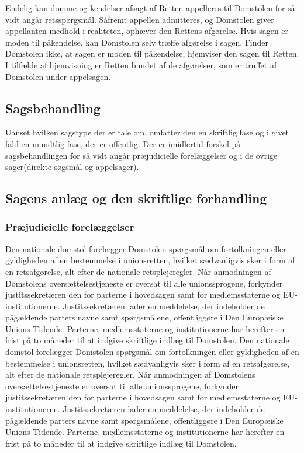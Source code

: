 \documentclass[]{book}
\begin{document}
Endelig kan domme og kendelser afsagt af Retten appelleres til Domstolen for så vidt angår retsspørgsmål. Såfremt appellen admitteres, og Domstolen giver appellanten medhold i realiteten, ophæver den Rettens afgørelse. Hvis sagen er moden til påkendelse, kan Domstolen selv træffe afgørelse i sagen. Finder Domstolen ikke, at sagen er moden til påkendelse, hjemviser den sagen til Retten. I tilfælde af hjemvisning er Retten bundet af de afgørelser, som er truffet af Domstolen under appelsagen.

\hypertarget{sagsbehandling}{%
\subsection{Sagsbehandling}\label{sagsbehandling}}

Uanset hvilken sagstype der er tale om, omfatter den en skriftlig fase og i givet fald en mundtlig fase, der er offentlig. Der er imidlertid forskel på sagsbehandlingen for så vidt angår præjudicielle forelæggelser og i de øvrige sager(direkte søgsmål og appelsager).

\hypertarget{sagens-anlg-og-den-skriftlige-forhandling}{%
\subsection{Sagens anlæg og den skriftlige forhandling}\label{sagens-anlg-og-den-skriftlige-forhandling}}

\hypertarget{prjudicielle-forelggelser-1}{%
\subsubsection{Præjudicielle forelæggelser}\label{prjudicielle-forelggelser-1}}

Den nationale domstol forelægger Domstolen spørgsmål om fortolkningen eller gyldigheden af en bestemmelse i unionsretten, hvilket sædvanligvis sker i form af en retsafgørelse, alt efter de nationale retsplejeregler. Når anmodningen af Domstolens oversættelsestjeneste er oversat til alle unionssprogene, forkynder justitssekretæren den for parterne i hovedsagen samt for medlemsstaterne og EU-institutionerne. Justitssekretæren lader en meddelelse, der indeholder de pågældende parters navne samt spørgsmålene, offentliggøre i Den Europæiske Unions Tidende. Parterne, medlemsstaterne og institutionerne har herefter en frist på to måneder til at indgive skriftlige indlæg til Domstolen.
Den nationale domstol forelægger Domstolen spørgsmål om fortolkningen eller gyldigheden af en bestemmelse i unionsretten, hvilket sædvanligvis sker i form af en retsafgørelse, alt efter de nationale retsplejeregler. Når anmodningen af Domstolens oversættelsestjeneste er oversat til alle unionssprogene, forkynder justitssekretæren den for parterne i hovedsagen samt for medlemsstaterne og EU-institutionerne. Justitssekretæren lader en meddelelse, der indeholder de pågældende parters navne samt spørgsmålene, offentliggøre i Den Europæiske Unions Tidende. Parterne, medlemsstaterne og institutionerne har herefter en frist på to måneder til at indgive skriftlige indlæg til Domstolen.
\end{document}
